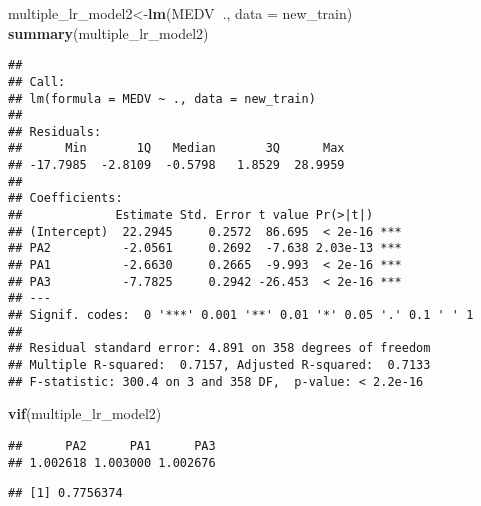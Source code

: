 \documentclass[
]{article}
\newenvironment{Shaded}{\begin{snugshade}}{\end{snugshade}}
\newcommand{\CommentTok}[1]{\textcolor[rgb]{0.56,0.35,0.01}{\textit{#1}}}
\newcommand{\DataTypeTok}[1]{\textcolor[rgb]{0.13,0.29,0.53}{#1}}
\newcommand{\KeywordTok}[1]{\textcolor[rgb]{0.13,0.29,0.53}{\textbf{#1}}}
\newcommand{\NormalTok}[1]{#1}
\newcommand{\OperatorTok}[1]{\textcolor[rgb]{0.81,0.36,0.00}{\textbf{#1}}}
\newcommand{\StringTok}[1]{\textcolor[rgb]{0.31,0.60,0.02}{#1}}
\begin{document}
\begin{Shaded}
\begin{Highlighting}[]
\NormalTok{multiple_lr_model2<-}\KeywordTok{lm}\NormalTok{(MEDV}\OperatorTok{~}\NormalTok{., }\DataTypeTok{data =}\NormalTok{ new_train)}
\KeywordTok{summary}\NormalTok{(multiple_lr_model2)}
\end{Highlighting}
\end{Shaded}

\begin{verbatim}
## 
## Call:
## lm(formula = MEDV ~ ., data = new_train)
## 
## Residuals:
##      Min       1Q   Median       3Q      Max 
## -17.7985  -2.8109  -0.5798   1.8529  28.9959 
## 
## Coefficients:
##             Estimate Std. Error t value Pr(>|t|)    
## (Intercept)  22.2945     0.2572  86.695  < 2e-16 ***
## PA2          -2.0561     0.2692  -7.638 2.03e-13 ***
## PA1          -2.6630     0.2665  -9.993  < 2e-16 ***
## PA3          -7.7825     0.2942 -26.453  < 2e-16 ***
## ---
## Signif. codes:  0 '***' 0.001 '**' 0.01 '*' 0.05 '.' 0.1 ' ' 1
## 
## Residual standard error: 4.891 on 358 degrees of freedom
## Multiple R-squared:  0.7157, Adjusted R-squared:  0.7133 
## F-statistic: 300.4 on 3 and 358 DF,  p-value: < 2.2e-16
\end{verbatim}

\begin{Shaded}
\begin{Highlighting}[]
\KeywordTok{vif}\NormalTok{(multiple_lr_model2)}
\end{Highlighting}
\end{Shaded}

\begin{verbatim}
##      PA2      PA1      PA3 
## 1.002618 1.003000 1.002676
\end{verbatim}

\begin{Shaded}
\end{Shaded}

\begin{verbatim}
## [1] 0.7756374
\end{verbatim}
\end{document}
